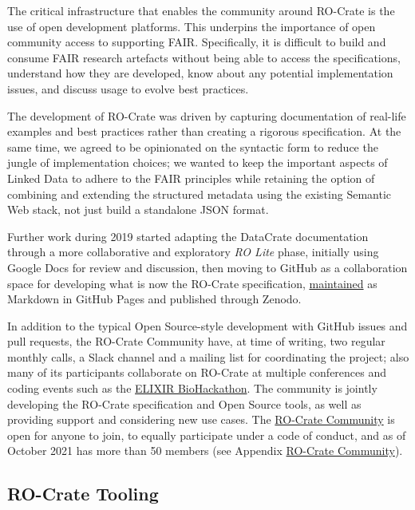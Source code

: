 {The critical infrastructure that enables the community around RO-Crate
is the use of open development platforms. This underpins the importance
of open community access to supporting FAIR. Specifically, it is
difficult to build and consume FAIR research artefacts without being
able to access the specifications, understand how they are developed,
know about any potential implementation issues, and discuss usage to
evolve best practices.

The development of RO-Crate was driven by capturing documentation of
real-life examples and best practices rather than creating a rigorous
specification. At the same time, we agreed to be opinionated on the
syntactic form to reduce the jungle of implementation choices; we wanted
to keep the important aspects of Linked Data to adhere to the FAIR
principles while retaining the option of combining and extending the
structured metadata using the existing Semantic Web stack, not just
build a standalone JSON format.

Further work during 2019 started adapting the DataCrate documentation
through a more collaborative and exploratory \emph{RO Lite} phase,
initially using Google Docs for review and discussion, then moving to
GitHub as a collaboration space for developing what is now the RO-Crate
specification,
\href{https://github.com/researchobject/ro-crate/}{maintained} as
Markdown in GitHub Pages and published through Zenodo.

In addition to the typical Open Source-style development with GitHub
issues and pull requests, the RO-Crate Community have, at time of
writing, two regular monthly calls, a Slack channel and a mailing list
for coordinating the project; also many of its participants collaborate
on RO-Crate at multiple conferences and coding events such as the
\href{https://biohackathon-europe.org/}{ELIXIR BioHackathon}. The
community is jointly developing the RO-Crate specification and Open
Source tools, as well as providing support and considering new use
cases. The
\href{https://www.researchobject.org/ro-crate/community}{RO-Crate
Community} is open for anyone to join, to equally participate under a
code of conduct, and as of October 2021 has more than 50 members (see
Appendix \protect\hyperlink{communitylist}{RO-Crate Community}).

\hypertarget{tooling}{%
\subsection{RO-Crate Tooling}\label{tooling}}

}
